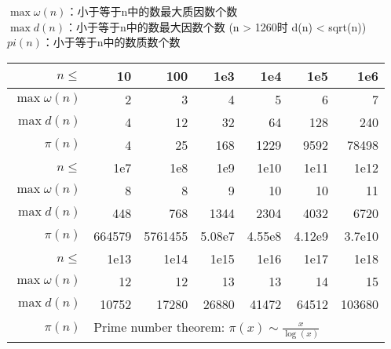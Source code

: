 \begin{center}
    $\max\omega(n)$：小于等于n中的数最大质因数个数\\
    $\max d(n)$：小于等于n中的数最大因数个数 (n > 1260时  d(n) < sqrt(n))\\
    $pi(n)$：小于等于n中的数质数个数\\
    \begin{tabular}{|r|r|r|r|r|r|r|}  
        \hline
        \rowcolor{gray!20}
        $n\leq$         & 10        & 100       & 1e3       & 1e4       & 1e5       & 1e6           \\ \hline  
        $\max\omega(n)$ & 2         & 3         & 4         & 5         & 6         & 7             \\ \hline 
        $\max d(n)$     & 4         & 12        & 32        & 64        & 128       & 240           \\ \hline 
        $\pi(n)$        & 4         & 25        & 168       & 1229      & 9592      & 78498         \\ \hline 
        \rowcolor{gray!20}
        $n\leq$         & 1e7       & 1e8       & 1e9       & 1e10      & 1e11      & 1e12          \\ \hline 
        $\max\omega(n)$ & 8         & 8         & 9         & 10        & 10        & 11            \\ \hline 
        $\max d(n)$     & 448       & 768       & 1344      & 2304      & 4032      & 6720          \\ \hline 
        $\pi(n)$        & 664579    & 5761455   & 5.08e7    & 4.55e8    & 4.12e9    & 3.7e10        \\ \hline 
        \rowcolor{gray!20}
        $n\leq$         & 1e13      & 1e14      & 1e15      & 1e16      & 1e17      & 1e18          \\ \hline 
        $\max\omega(n)$ & 12        & 12        & 13        & 13        & 14        & 15            \\ \hline 
        $\max d(n)$     & 10752     & 17280     & 26880     & 41472     & 64512     & 103680        \\ \hline 
        $\pi(n)$        & \multicolumn{5}{l}{Prime number theorem: $\pi(x) \sim \frac{x}{\log(x)}$}&\\ \hline 
    \end{tabular}
\end{center}